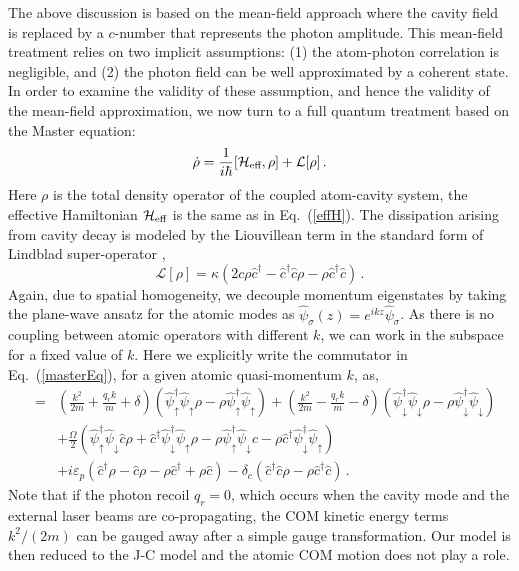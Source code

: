 \documentclass[atoms,article,submit,moreauthors,pdftex,12pt,a4paper]{mdpi}
\def\be{\begin{equation}}
\def\ee{\end{equation}}
\def\ba{\begin{eqnarray}}
\def\ea{\end{eqnarray}}
\begin{document}
The above discussion is based on the mean-field approach where the cavity field is replaced by a $c$-number that represents the photon amplitude. This mean-field treatment relies on two implicit assumptions: (1) the atom-photon correlation is negligible, and (2) the photon field can be well approximated by a coherent state. In order to examine the validity of these assumption, and hence the validity of the mean-field approximation, we now turn to a full quantum treatment based on the Master equation:
\be 
\dot{\rho} = \frac{1}{i\hbar}[{\cal H}_{\text{eff}},\rho]+\mathcal{L}[\rho] \,. \label{masterEq}
\ee
Here $\rho$ is the total density operator of the coupled atom-cavity system, the effective Hamiltonian ${\cal H}_{\text{eff}}$ is the same as in Eq.~(\ref{effH}). The dissipation arising from cavity decay is modeled by the Liouvillean term in the 
standard form of Lindblad super-operator \cite{L1, L2},
\be 
\mathcal{L}[\rho] = \kappa (2c\rho \hat{c}^\dagger-\hat{c}^\dagger \hat{c}\rho-\rho \hat{c}^\dagger \hat{c})\,.\label{Lindblad}
\ee
Again, due to spatial homogeneity, we decouple momentum eigenstates by taking the plane-wave ansatz for the atomic modes as $\hat{\psi}_\sigma({z})=e^{i{k}{z}}\hat{\psi}_\sigma$. As there is no coupling between atomic operators with different $k$, we can work in the subspace for a fixed value of $k$. Here we explicitly write the commutator in Eq.~(\ref{masterEq}), for a given atomic quasi-momentum $k$, as,
\ba
[{\cal H}_{\text{eff}}({k}),\rho] & = & \left(\frac{{ k}^{2}}{2m}+\frac{q_{r}k}{m}+\delta\right)\left(\hat{\psi}_{\uparrow}^{\dagger} \hat{\psi}_{\uparrow}\rho-\rho \hat{\psi}_{\uparrow}^{\dagger} \hat{\psi}_{\uparrow}\right)+\left(\frac{{k}^{2}}{2m}-\frac{q_{r}k}{m}-\delta\right) \left(\hat{\psi}_{\downarrow}^{\dagger} \hat{\psi}_{\downarrow}\rho-\rho \hat{\psi}_{\downarrow}^{\dagger} \hat{\psi}_{\downarrow}\right)\nonumber\\
 &  & + \frac{\Omega}{2}\left(\hat{\psi}_{\uparrow}^{\dagger} \hat{\psi}_{\downarrow} \hat{c} \rho+\hat{c}^{\dagger} \hat{\psi}_{\downarrow}^{\dagger} \hat{\psi}_{\uparrow}\rho-\rho \hat{\psi}_{\uparrow}^{\dagger} \hat{\psi}_{\downarrow}c-\rho \hat{c}^{\dagger} \hat{\psi}_{\downarrow}^{\dagger} \hat{\psi}_{\uparrow}\right)\nonumber\\
&& + i\varepsilon_{p}\left(\hat{c}^{\dagger}\rho-\hat{c}\rho-\rho \hat{c}^{\dagger}+\rho \hat{c}\right)-\delta_{c}\left(\hat{c}^{\dagger}\hat{c}\rho-\rho \hat{c}^{\dagger}\hat{c}\right)\,.
\ea
Note that if the photon recoil $q_r=0$, which occurs when the cavity mode and the external laser beams are co-propagating, the COM kinetic energy terms $k^2/(2m)$ can be gauged away after a simple gauge transformation. Our model is then reduced to the J-C model and the atomic COM motion does not play a role.
\end{document}
